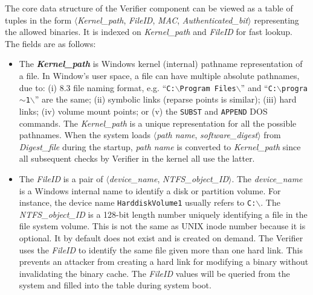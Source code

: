 The core data structure of the Verifier component can be viewed
as a table of tuples in the form
$\langle${\it Kernel\_path}, {\it FileID}, {\it MAC}, 
{\it Authenticated\_bit}$\rangle$
representing the allowed binaries.
It is indexed on {\it Kernel\_path} and {\it FileID} for fast lookup.
The fields are as follows:
\begin{itemize}
\item The {\bf {\it Kernel\_path}} is Windows kernel (internal) pathname 
representation of a file.
In Window's user space, a file can have multiple absolute pathnames, due to:
(i) 8.3 file naming format, e.g.
``{\tt C:\linebreak[0]$\backslash$\linebreak[0]Program Files\linebreak[0]$\backslash$\linebreak[0]}''
and
``{\tt C:\linebreak[0]$\backslash$\linebreak[0]progra$\sim$1\linebreak[0]$\backslash$\linebreak[0]}''
are the same;
(ii) symbolic links (reparse points is similar);
(iii) hard links;
(iv) volume mount points;
or
(v) the {\tt SUBST} and {\tt APPEND} DOS commands.
The {\it Kernel\_path} is a unique representation for all
the possible pathnames.
When the system loads $\langle${\it path name}, {\it software\_digest}$\rangle$ 
from {\it Digest\_file} during the startup, {\it path name} is converted to 
{\it Kernel\_path} since all subsequent checks by Verifier in the kernel 
all use the latter.

\item The {\it FileID} is a pair of $\langle${\it device\_name}, {\it NTFS\_object\_ID}$\rangle$.
The {\it device\_name} is a Windows internal name to identify a 
disk or partition volume.
For instance, the device name {\tt HarddiskVolume1} usually refers to {\tt C:$\backslash$}.
The {\it NTFS\_object\_ID} is a 128-bit length number uniquely identifying
a file in the file system volume.
This is not the same as UNIX inode number because it is optional.
It by default does not exist and is created on demand.
The Verifier uses the {\it FileID} 
to identify the same file given more than one hard link.
This prevents an attacker from creating a hard link for modifying
a binary without invalidating the binary cache.
The {\it FileID} values will be queried from the system and 
filled into the table during system boot.


\end{itemize}
